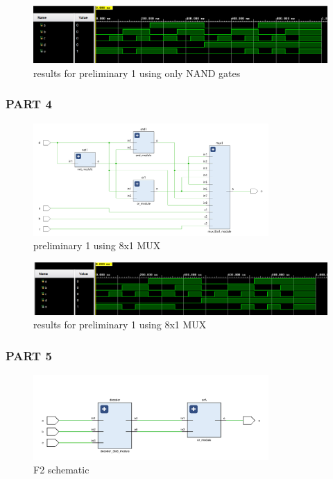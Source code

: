 \documentclass[pdftex,12pt,a4paper]{article}
\begin{document}
    \begin{figure}[H]
    	\centering
    	\includegraphics[width=1\textwidth]{simulations/prelim_1_e_result.png}	
    	\caption{results for preliminary 1 using only NAND gates}
    	\label{results for preliminary 1 using only NAND gates}
    \end{figure}




\subsubsection{PART 4}

    \begin{figure}[H]
    	\centering
    	\includegraphics[width=0.8\textwidth]{schematic/prelim_1_f_sch.png}	
    	\caption{preliminary 1 using 8x1 MUX}
    	\label{preliminary 1 using 8x1 MUX}
    \end{figure}


    \begin{figure}[H]
    	\centering
    	\includegraphics[width=1\textwidth]{simulations/prelim_1_f_result.png}	
    	\caption{results for preliminary 1 using 8x1 MUX}
    	\label{results for preliminary 1 using 8x1 MUX}
    \end{figure}




\subsubsection{PART 5}
    \begin{figure}[H]
    	\centering
    	\includegraphics[width=0.8\textwidth]{schematic/F2_schematic.png}	
    	\caption{F2 schematic}
    	\label{F2 schematic}
    \end{figure}
    
\end{document}
